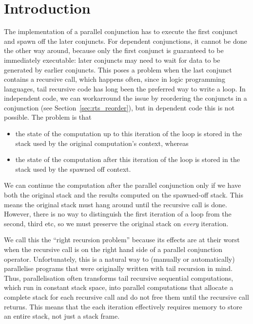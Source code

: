 \section{Introduction}
\label{sec:lc_intro}


The implementation of a parallel conjunction
has to execute the first conjunct and spawn off the later conjuncts.
For dependent conjunctions, it cannot be done the other way around,
because only the first conjunct is guaranteed to be immediately executable:
later conjuncts may need to wait for data to be generated by earlier
conjuncts.
This poses a problem when the last conjunct contains a recursive call,
which happens often,
since in logic programming languages,
tail recursive code has long been the preferred way to write a loop.
In independent code,
we can workarround the issue by reordering the conjuncts
in a conjunction (see Section~\ref{sec:rts_reorder}),
but in dependent code this is not possible.
The problem is that
\begin{itemize}
\item
the state of the computation up to this iteration of the loop
is stored in the stack used by the original computation's context,
whereas
\item
the state of the computation after this iteration of the loop
is stored in the stack used by the spawned off context.
\end{itemize}
We can continue the computation after the parallel conjunction
only if we have both the original stack
and the results computed on the spawned-off stack.
This means the original stack must hang around
until the recursive call is done.
However, there is no way to distinguish
the first iteration of a loop from the second, third etc,
so we must preserve the original stack on \emph{every} iteration.

We call this the ``right recursion problem'' because its effects are at
their worst when the recursive call is on the right hand side of a
parallel conjunction operator.
Unfortunately,
this is a natural way to (manually or automatically) parallelise programs
that were originally written with tail recursion in mind.
Thus, parallelisation often
transforms tail recursive sequential computations,
which run in constant stack space,
into parallel computations
that allocate a complete stack for each recursive call
and do not free them until the recursive call returns.
This means that the each iteration effectively requires memory
to store an entire stack, not just a stack frame.

